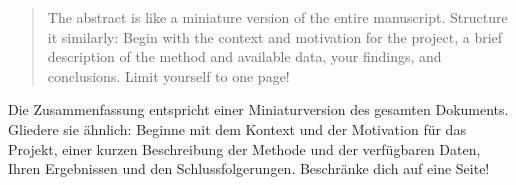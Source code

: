 
\renewcommand{\abstractname}{Abstract} %


\begin{abstract}
\addchaptertocentry{\abstractname} %
The abstract is like a miniature version of the entire manuscript. Structure it similarly: Begin with the context and motivation for the project, a brief description of the method and available data, your findings, and conclusions. Limit yourself to one page!
\end{abstract}


\begin{extraAbstract}
\addchaptertocentry{\extraabstractname} %

Die Zusammenfassung entspricht einer Miniaturversion des gesamten Dokuments. Gliedere sie ähnlich: Beginne mit dem Kontext und der Motivation für das Projekt, einer kurzen Beschreibung der Methode und der verfügbaren Daten, Ihren Ergebnissen und den Schlussfolgerungen. Beschränke dich auf eine Seite!    
\end{extraAbstract}

